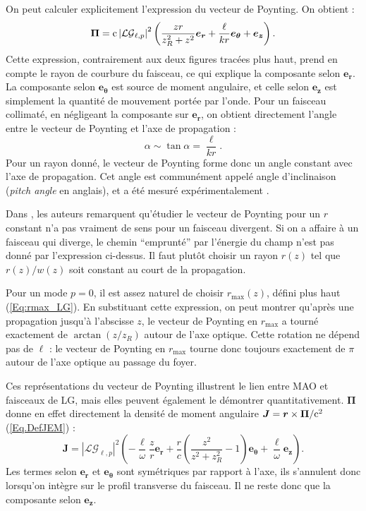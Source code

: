 On peut calculer explicitement l'expression du vecteur de Poynting. On obtient  :
\begin{equation}
\bm{\Pi} = \mathrm{c}\left|\mathcal{LG}_{\ell,p}\right|^2\left(\frac{zr}{z_R^2+z^2}\bm{e_r}+\frac{\ell}{kr}\bm{e_\theta}+\bm{e_z}\right).
\end{equation}
Cette expression, contrairement aux deux figures tracées plus haut, prend en compte le rayon de courbure du faisceau, ce qui explique la composante selon $\bm{e_r}$. La composante selon $\bm{e_\theta}$ est source de moment angulaire, et celle selon $\bm{e_z}$ est simplement la quantité de mouvement portée par l'onde. Pour un faisceau collimaté, en négligeant la composante sur $\bm{e_r}$, on obtient directement l'angle entre le vecteur de Poynting et l'axe de propagation :
\begin{equation}
\alpha \sim \tan{\alpha} = \frac{\ell}{kr}.
\end{equation}
Pour un rayon donné, le vecteur de Poynting forme donc un angle constant avec l'axe de propagation. Cet angle est communément appelé angle d'inclinaison (\textit{pitch angle} en anglais), et a été mesuré expérimentalement .\par
Dans , les auteurs remarquent qu'étudier le vecteur de Poynting pour un $r$ constant n'a pas vraiment de sens pour un faisceau divergent. Si on a affaire à un faisceau qui diverge, le chemin ``emprunté'' par l'énergie du champ n'est pas donné par l'expression ci-dessus. Il faut plutôt choisir un rayon $r(z)$ tel que $r(z)/w(z)$ soit constant au court de la propagation.\par
Pour un mode $p=0$, il est assez naturel de choisir $r_\mathrm{max}(z)$, défini plus haut (\ref{Eq:rmax_LG}). En substituant cette expression, on peut montrer  qu'après une propagation jusqu'à l'abscisse $z$, le vecteur de Poynting en $r_\mathrm{max}$ a tourné exactement de $\arctan{(z/z_R)}$ autour de l'axe optique. Cette rotation ne dépend pas de $\ell$ : le vecteur de Poynting en $r_\mathrm{max}$ tourne donc toujours exactement de $\pi$ autour de l'axe optique au passage du foyer. 

Ces représentations du vecteur de Poynting illustrent le lien entre MAO et faisceaux de LG, mais elles peuvent également le démontrer quantitativement. $\bm{\Pi}$ donne en effet directement la densité de moment angulaire $\bm{J} = \bm{r}\times\bm{\Pi}/\mathrm{c}^2$ (\ref{Eq.DefJEM}) :
\begin{equation}
\bm{J} = \left|\mathcal{LG}_{\ell,p}\right|^2\left(-\frac{\ell}{\omega}\frac{z}{r}\bm{e_r}+\frac{r}{c}\left(\frac{z^2}{z^2+z_R^2} -1\right)\bm{e_\theta}+\frac{\ell}{\omega}\bm{e_z}\right).
\end{equation}
Les termes selon $\bm{e_r}$ et $\bm{e_\theta}$ sont symétriques par rapport à l'axe, ils s'annulent donc lorsqu'on intègre sur le profil transverse du faisceau. Il ne reste donc que la composante selon $\bm{e_z}$. 

